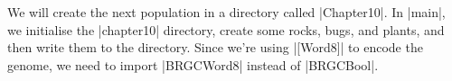 We will create the next population in a directory called |Chapter10|.
In |main|, we initialise the |chapter10| directory, create some rocks,
bugs, and plants, and then write them to the directory.
Since we're using |[Word8]| to encode the genome, we need to import
|BRGCWord8| instead of |BRGCBool|.


